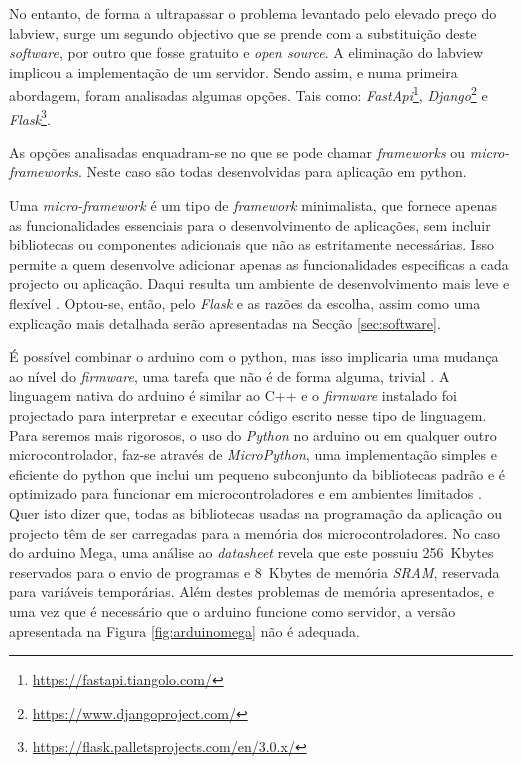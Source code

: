 No entanto, de forma a ultrapassar o problema levantado pelo elevado preço do \acrshort{labview}, surge um segundo objectivo que se prende com a substituição deste \textit{software}, por outro que fosse gratuito e \textit{open source}. A eliminação do \acrshort{labview} implicou a implementação de um servidor. Sendo assim, e numa primeira abordagem, foram analisadas algumas opções. Tais como: \textit{FastApi}\footnote{\url{https://fastapi.tiangolo.com/}}, \textit{Django}\footnote{\url{https://www.djangoproject.com/}} e \textit{Flask}\footnote{\url{https://flask.palletsprojects.com/en/3.0.x/}}.

As opções analisadas enquadram-se no que se pode chamar \textit{frameworks} ou \textit{micro-frameworks}. Neste caso são todas desenvolvidas para aplicação em \gls{python}.

Uma \textit{micro-framework} é um tipo de \textit{framework} minimalista, que fornece apenas as funcionalidades essenciais para o desenvolvimento de aplicações, sem incluir bibliotecas ou componentes adicionais que não as estritamente necessárias. Isso permite a quem desenvolve adicionar apenas as funcionalidades especificas a cada projecto ou aplicação. Daqui resulta um ambiente de desenvolvimento mais leve e flexível \cite{Flask}.
Optou-se, então, pelo \textit{Flask} e as razões da escolha, assim como uma explicação mais detalhada serão apresentadas na Secção \ref{sec:software}.

É possível combinar o \gls{arduino} com o \gls{python}, mas isso implicaria uma mudança ao nível do \textit{firmware}, uma tarefa que não é de forma alguma, trivial \cite{Arduinopython}. A linguagem nativa do \gls{arduino} é similar ao C++ e o \textit{firmware} instalado foi projectado para interpretar e executar código escrito nesse tipo de linguagem. Para seremos mais rigorosos, o uso do \textit{Python} no \gls{arduino} ou em qualquer outro microcontrolador, faz-se através de \textit{MicroPython}, uma implementação simples e eficiente do \gls{python} que inclui um pequeno subconjunto da bibliotecas padrão e é optimizado para funcionar em microcontroladores e em ambientes limitados \cite{MicroPythondefinition}. Quer isto dizer que, todas as bibliotecas usadas na programação da aplicação ou projecto têm de ser carregadas para a memória dos microcontroladores. No caso do \gls{arduino} Mega, uma análise ao \textit{datasheet} \cite{megadatasheet} revela que este possuiu \SI{256}{Kbytes} reservados para o envio de programas e \SI{8}{Kbytes} de memória \textit{SRAM}, reservada para variáveis temporárias.
Além destes problemas de memória apresentados, e uma vez que é necessário que o \gls{arduino} funcione como servidor, a versão apresentada na Figura \ref{fig:arduinomega} não é adequada.

